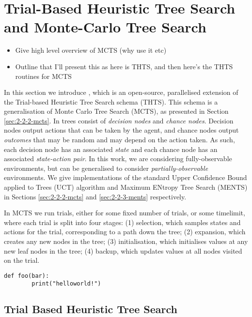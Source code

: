 \section{Trial-Based Heuristic Tree Search and Monte-Carlo Tree Search}
\label{sec:2-2-thts}

    \begin{itemize}
        \item Give high level overview of MCTS (why use it etc)
        \item Outline that I'll present this as here is THTS, and then here's the THTS routines for MCTS
    \end{itemize}

    In this section we introduce \thtspp\ewe \cite{thtspp}, which is an open-source, parallelised extension of the  Trial-based Heuristic Tree Search schema \cite{thts} (THTS). This schema is a generalisation of Monte Carlo Tree Search (MCTS), as presented in Section \ref{sec:2-2-2-mcts}. In \thtspp\ewe trees consist of \textit{decision nodes} and \textit{chance nodes}. Decision nodes output actions that can be taken by the agent, and chance nodes output \textit{outcomes} that may be random and may depend on the action taken. As such, each decision node has an associated \textit{state} and each chance node has an associated \textit{state-action pair}. In this work, we are considering fully-observable environments, but \thtspp\ewe can be generalised to consider \textit{partially-observable} environments. We give \thtspp\ewe implementations of the standard Upper Confidence Bound applied to Trees (UCT) algorithm and Maximum ENtropy Tree Search (MENTS) in Sections \ref{sec:2-2-2-mcts} and \ref{sec:2-2-3-ments} respectively.

    In MCTS we run trials, either for some fixed number of trials, or some timelimit, where each trial is split into four stages: 
        (1) selection, which samples states and actions for the trial, corresponding to a path down the tree;
        (2) expansion, which creates any new nodes in the tree; 
        (3) initialisation, which initialises values at any new leaf nodes in the tree;
        (4) backup, which updates values at all nodes visited on the trial.


    \begin{lstlisting}
def foo(bar):
        print("helloworld!")
    \end{lstlisting}

    \subsection{Trial Based Heuristic Tree Search}
    \label{sec:2-2-1-thts}
    
